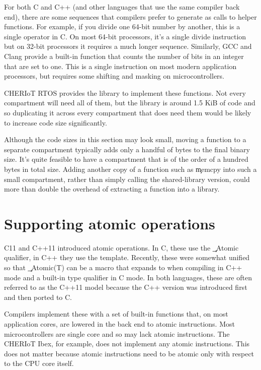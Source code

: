 For both C and C++ (and other languages that use the same compiler back end), there are some sequences that compilers prefer to generate as calls to helper functions.
For example, if you divide one 64-bit number by another, this is a single operator in C.
On most 64-bit processors, it's a single divide instruction but on 32-bit processors it requires a much longer sequence.
Similarly, GCC and Clang provide a  built-in function that counts the number of bits in an integer that are set to one.
This is a single instruction on most modern application processors, but requires some shifting and masking on microcontrollers.

CHERIoT RTOS provides the  library to implement these functions.
Not every compartment will need all of them, but the library is around 1.5 KiB of code and so duplicating it across every compartment that does need them would be likely to increase code size significantly.

Although the code sizes in this section may look small, moving a function to a separate compartment typically adds only a handful of bytes to the final binary size.
It's quite feasible to have a compartment that is of the order of a hundred bytes in total size.
Adding another copy of a function such as \c{memcpy} into such a small compartment, rather than simply calling the shared-library version, could more than double the overhead of extracting a function into a library.

\section{Supporting atomic operations}

C11 and C++11 introduced atomic operations.
In C, these use the \c{_Atomic} qualifier, in C++ they use the  template.
Recently, these were somewhat unified so that \c{_Atomic(T)} can be a macro that expands to  when compiling in C++ mode and a built-in type qualifier in C mode.
In both languages, these are often referred to as the C++11 model because the C++ version was introduced first and then ported to C.

Compilers implement these with a set of built-in functions that, on most application cores, are lowered in the back end to atomic instructions.
Most microcontrollers are single core and so may lack atomic instructions.
The CHERIoT Ibex, for example, does not implement any atomic instructions.
This does not matter because atomic instructions need to be atomic only with respect to the CPU core itself.

